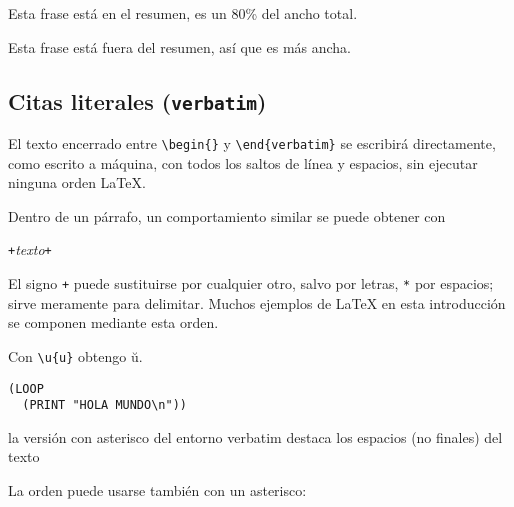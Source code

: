 \newenvironment{abstract}%
        {\begin{center}\begin{small}\begin{minipage}{0.8\textwidth}}%
        {\end{minipage}\end{small}\end{center}}
\begin{example}
\begin{abstract}
Esta frase está en el resumen,
es un 80\% del ancho total.
\end{abstract}
Esta frase está fuera del 
resumen, así que es más ancha.
\end{example}

\subsection{Citas literales (\texttt{verbatim})}

El texto encerrado entre \verb|\begin{|\verb|}| y \verb|\end{verbatim}| se escribirá directamente, como escrito a máquina, con todos los saltos de línea y espacios, sin ejecutar ninguna orden \LaTeX{}.

Dentro de un párrafo, un comportamiento similar se puede obtener con
\begin{lscommand}
\verb|+|\emph{texto}\verb|+|
\end{lscommand}
El signo \verb|+| puede sustituirse por cualquier otro, salvo por letras, \verb|*| por espacios; sirve meramente para delimitar.  Muchos ejemplos de \LaTeX{} en esta introducción se componen mediante esta orden.

\begin{example}
Con \verb|\u{u}| obtengo \u{u}.

\begin{verbatim}
(LOOP
  (PRINT "HOLA MUNDO\n"))
\end{verbatim}
\end{example}

\begin{example}
\begin{verbatim*}
la versión con asterisco
del      entorno verbatim
destaca los espacios (no
finales)  del  texto
\end{verbatim*}
\end{example}

La orden  puede usarse también con un asterisco:

